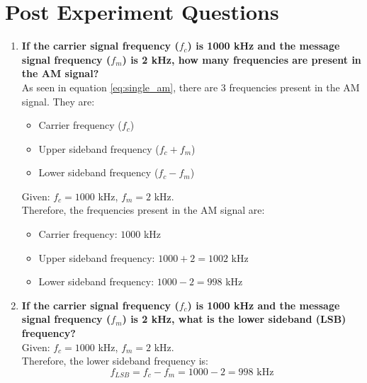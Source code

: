 \section*{Post Experiment Questions}
\begin{enumerate}
     \item \textbf{If the carrier signal frequency ($f_c$) is 1000 kHz and the message signal frequency ($f_m$) is
        2 kHz, how many frequencies are present in the AM signal?} \\
        As seen in equation \ref{eq:single_am}, there are 3 frequencies present in the AM signal. They are:
        \begin{itemize}
            \item Carrier frequency ($f_c$)
            \item Upper sideband frequency ($f_c + f_m$)
            \item Lower sideband frequency ($f_c - f_m$)
        \end{itemize}
        Given: $f_c = 1000$ kHz, $f_m = 2$ kHz.\\
        Therefore, the frequencies present in the AM signal are:
        \begin{itemize}
            \item Carrier frequency: $1000$ kHz
            \item Upper sideband frequency: $1000 + 2 = 1002$ kHz
            \item Lower sideband frequency: $1000 - 2 = 998$ kHz
        \end{itemize}

        \item \textbf{If the carrier signal frequency ($f_c$) is 1000 kHz and the message signal frequency ($f_m$) is
        2 kHz, what is the lower sideband (LSB) frequency?} \\
        Given: $f_c = 1000$ kHz, $f_m = 2$ kHz.\\
        Therefore, the lower sideband frequency is:
        \[
            f_{LSB} = f_c - f_m = 1000 - 2 = 998 \text{ kHz}
        \]


\end{enumerate}
